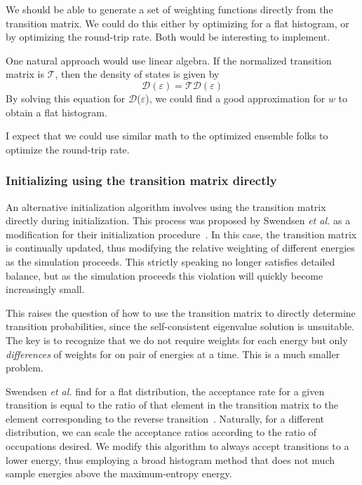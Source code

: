 \documentclass[letterpaper,twocolumn,amsmath,amssymb,pre,aps,10pt]{revtex4-1}
\begin{document}
We should be able to generate a set of weighting functions directly
from the transition matrix.  We could do this either by optimizing for
a flat histogram, or by optimizing the round-trip rate.  Both would be
interesting to implement.

One natural approach would use linear algebra.  If the normalized
transition matrix is $\mathcal{T}$, then the density of states is given by
\begin{equation}
  \mathcal{D}(\varepsilon) = \mathcal{T}\mathcal{D}(\varepsilon) 
\end{equation}
By solving this equation for $\mathcal{D}$($\varepsilon$), we could find a 
good approximation for $w$ to obtain a flat histogram.

I expect that we could use similar math to the optimized ensemble
folks to optimize the round-trip rate.

\subsubsection{Initializing using the transition matrix directly}

An alternative initialization algorithm involves using the transition
matrix directly during initialization.  This process was proposed by
Swendsen \emph{et al.} as a modification for their initialization
procedure~\cite{swendsen1999transition}.  In this case, the transition
matrix is continually updated, thus modifying the relative weighting
of different energies as the simulation proceeds.  This strictly
speaking no longer satisfies detailed balance, but as the simulation
proceeds this violation will quickly become increasingly small.

This raises the question of how to use the transition matrix to
directly determine transition probabilities, since the self-consistent
eigenvalue solution is unsuitable.  The key is to recognize that we do
not require weights for each energy but only \emph{differences} of
weights for on pair of energies at a time.  This is a much smaller
problem.

Swendsen \emph{et al.} find for a flat distribution, the acceptance
rate for a given transition is equal to the ratio of that element in
the transition matrix to the element corresponding to the reverse
transition~\cite{swendsen1999transition}.  Naturally, for a different
distribution, we can scale the acceptance ratios according to the
ratio of occupations desired.  We modify this algorithm to always
accept transitions to a lower energy, thus employing a broad histogram
method that does not much sample energies above the maximum-entropy
energy.
\end{document}
